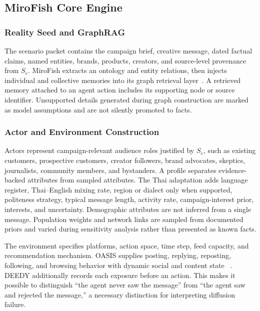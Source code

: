 \documentclass[conference]{IEEEtran}
\begin{document}
\subsection{MiroFish Core Engine}

\subsubsection{Reality Seed and GraphRAG}

The scenario packet contains the campaign brief, creative message, dated
factual claims, named entities, brands, products, creators, and source-level
provenance from $S_e$.
MiroFish extracts an ontology and entity relations, then injects individual and
collective memories into its graph retrieval layer~\cite{mirofish2026}. A
retrieved memory attached to an agent action includes its supporting node or
source identifier. Unsupported details generated during graph construction are
marked as model assumptions and are not silently promoted to facts.

\subsubsection{Actor and Environment Construction}

Actors represent campaign-relevant audience roles justified by $S_e$, such as
existing customers, prospective customers, creator followers, brand advocates,
skeptics, journalists, community members, and bystanders. A profile separates
evidence-backed attributes from sampled attributes. The Thai adaptation adds
language register, Thai--English mixing rate, region or dialect only when
supported, politeness strategy, typical message length, activity rate,
campaign-interest prior, interests, and uncertainty. Demographic attributes
are not inferred from a single message. Population weights and network links
are sampled from documented priors and varied during sensitivity analysis
rather than presented as known facts.

The environment specifies platforms, action space, time step, feed capacity,
and recommendation mechanism. OASIS supplies posting, replying, reposting,
following, and browsing behavior with dynamic social and content state
~\cite{yang2024oasis}. DEEDY additionally records each exposure before an
action. This makes it possible to distinguish ``the agent never saw the
message'' from ``the agent saw and rejected the message,'' a necessary
distinction for interpreting diffusion failure.
\end{document}
